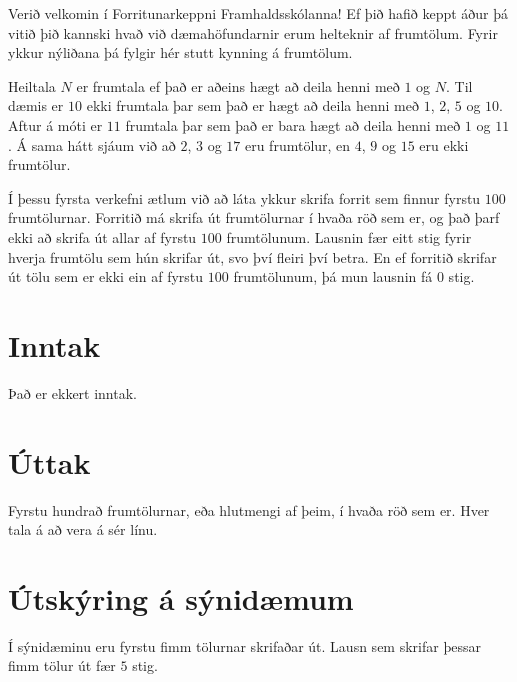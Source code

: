 Verið velkomin í Forritunarkeppni Framhaldsskólanna! Ef þið hafið keppt áður þá vitið þið kannski hvað við dæmahöfundarnir erum helteknir af frumtölum. Fyrir ykkur nýliðana þá fylgir hér stutt kynning á frumtölum.

Heiltala $N$ er frumtala ef það er aðeins hægt að deila henni með $1$ og $N$. Til dæmis er $10$ ekki frumtala þar sem það er hægt að deila henni með $1$, $2$, $5$ og $10$. Aftur á móti er $11$ frumtala þar sem það er bara hægt að deila henni með $1$ og $11$. Á sama hátt sjáum við að $2$, $3$ og $17$ eru frumtölur, en $4$, $9$ og $15$ eru ekki frumtölur.

Í þessu fyrsta verkefni ætlum við að láta ykkur skrifa forrit sem finnur fyrstu $100$ frumtölurnar. Forritið má skrifa út frumtölurnar í hvaða röð sem er, og það þarf ekki að skrifa út allar af fyrstu $100$ frumtölunum. Lausnin fær eitt stig fyrir hverja frumtölu sem hún skrifar út, svo því fleiri því betra. En ef forritið skrifar út tölu sem er ekki ein af fyrstu $100$ frumtölunum, þá mun lausnin fá $0$ stig.

\section*{Inntak}
Það er ekkert inntak.

\section*{Úttak}
Fyrstu hundrað frumtölurnar, eða hlutmengi af þeim, í hvaða röð sem er. Hver tala á að vera á sér línu.

\section*{Útskýring á sýnidæmum}
Í sýnidæminu eru fyrstu fimm tölurnar skrifaðar út. Lausn sem skrifar þessar fimm tölur út fær $5$ stig.
